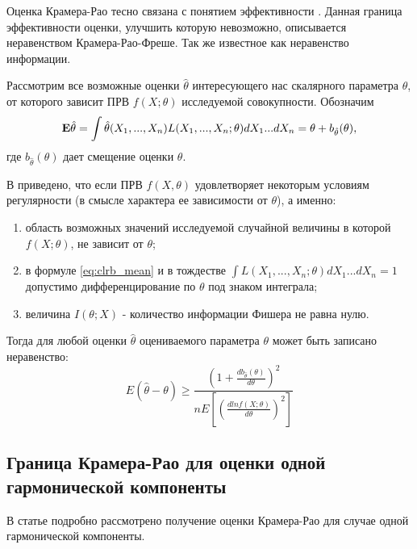 Оценка Крамера-Рао тесно связана с понятием эффективности . Данная граница эффективности оценки, улучшить которую невозможно, описывается
неравенством Крамера-Рао-Фреше. Так же известное как неравенство информации.

Рассмотрим все возможные оценки ${\hat{\theta}}$ интересующего нас скалярного параметра ${\theta}$, от которого зависит ПРВ ${f(X; \theta)}$
исследуемой совокупности. Обозначим
\begin{equation}
	\label{eq:clrb_mean}
	{\bf{E}} \hat{\theta} = \int \hat{\theta} (X_1, ..., X_n)L(X_1, ..., X_n; \theta) dX_1 ... dX_n= \theta + b_{\hat{\theta}}(\theta),
\end{equation}
где ${b_{\hat{\theta}}(\theta)}$ дает смещение оценки ${\theta}$.

В \cite{ayvazyan-book} приведено, что если  ПРВ ${f(X, \theta)}$  
удовлетворяет некоторым  условиям регулярности (в смысле характера ее зависимости от ${\theta}$), а именно:
\begin{enumerate}
\item область возможных значений исследуемой случайной величины в которой ${f(X; \theta)}$, не зависит от ${\theta}$;
\item в формуле \ref{eq:clrb_mean} и в тождестве ${\int L(X_1, ..., X_n;\theta) dX_1...dX_n = 1}$ допустимо дифференцирование по ${\theta}$ под знаком интеграла;
\item величина ${I(\theta; X)}$ - количество информации Фишера не равна нулю.
\end{enumerate}

Тогда для любой оценки ${\hat{\theta}}$ оцениваемого параметра ${\theta}$ может быть записано неравенство:
\begin{equation}
	\label{eq:crlb_base3}
	E(\hat{\theta} - \theta) \ge \frac{(1 + \frac{d b_{\hat{\theta}} (\theta)}{d \theta})^2}{n E \left[ \left( \frac{d ln f(X; \theta)}{d \theta} \right)^2 \right]}
\end{equation}

\subsection{Граница Крамера-Рао для оценки одной гармонической компоненты}
В статье \cite{rife-crlb-article} подробно рассмотрено получение оценки Крамера-Рао для случае одной гармонической компоненты.

